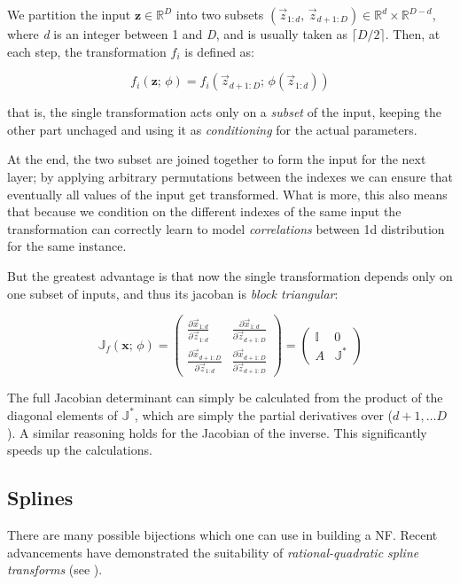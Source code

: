 We partition the input $\mathbf{z} \in \mathbb{R}^D$ into two subsets $(\vec z_{1:d}, \, \vec z_{d+1:D}) \in \mathbb{R}^d \times \mathbb{R}^{D-d}$, where \emph{d} is an integer between 1 and \emph{D}, and is usually taken as $\lceil D/2 \rceil$. Then, at each step, the transformation $f_i$ is defined as:

\[
f_i(\mathbf{z}; \, \phi) = f_i(\vec z_{d+1:D}; \, \phi(\vec z_{1:d}))
\]

that is, the single transformation acts only on a \emph{subset} of the input, keeping the other part unchaged and using it as \emph{conditioning} for the actual parameters. 

At the end, the two subset are joined together to form the input for the next layer; by applying arbitrary permutations between the indexes we can ensure that eventually all values of the input get transformed. What is more, this also means that because we condition on the different indexes of the same input the transformation can correctly learn to model \emph{correlations} between 1d distribution for the same instance.

But the greatest advantage is that now the single transformation depends only on one subset of inputs, and thus its jacoban is \emph{block triangular}:

\[
\mathbb{J}_{f}(\mathbf{x}; \, \phi) = 
\begin{pmatrix}
\frac{\partial \vec x_{1:d}}{\partial \vec z_{1:d}} & \frac{\partial \vec x_{1:d}}{\partial \vec z_{d+1:D}}\\
\frac{\partial \vec x_{d+1:D}}{\partial \vec z_{1:d}} & \frac{\partial \vec x_{d+1:D}}{\partial \vec z_{d+1:D}}
\end{pmatrix}
=
\begin{pmatrix}
\mathbb{I} & 0\\
A & \mathbb{J}^*
\end{pmatrix}
\]

The full Jacobian determinant can simply be calculated from the product of the diagonal elements of $\mathbb{J}^*$, which are simply the partial derivatives over ($d+1, \dots D$). A similar reasoning holds for the Jacobian of the inverse.
This significantly speeds up the calculations.

\subsection{Splines}

There are many possible bijections which one can use in building a NF. Recent advancements have demonstrated the suitability of \emph{rational-quadratic spline transforms} (see \cite{durkan}). 

